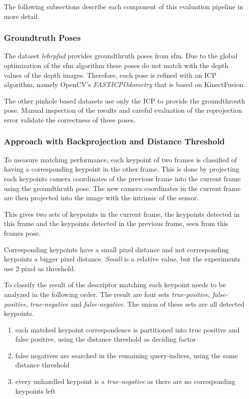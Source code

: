 The following subsections describe each component of this evaluation pipeline in more detail.

\subsubsection{Groundtruth Poses}

The dataset \emph{lehrpfad} provides groundthruth poses from \gls{sfm}.
Due to the global optimization of the \gls{sfm} algorithm these poses do not match with the depth values of the depth images.
Therefore, each pose is refined with an ICP algorithm, namely OpenCV's \emph{FASTICPOdometry} that is based on KinectFusion\cite{newcombe_ismar2011}.

The other pinhole based datasets use only the ICP to provide the groundthrouth pose.
Manual inspection of the results and careful evaluation of the reprojection error validate the correctness of these poses.

\subsubsection{Approach with Backprojection and Distance Threshold}

To measure matching performance, each keypoint of two frames is classified of having a corresponding keypoint in the other frame.
This is done by projecting each keypoints camera coordinates of the previous frame into the current frame using the groundthruth pose.
The new camera coordinates in the current frame are then projected into the image with the intrinsic of the sensor.

This gives two sets of keypoints in the current frame, the keypoints detected in this frame and the keypoints detected in the previous frame, seen from this frames pose.


Corresponding keypoints have a small pixel distance and not corresponding keypoints a bigger pixel distance.
\emph{Small} is a relative value, but the experiments use 2 pixel as threshold.

To classify the result of the descriptor matching each keypoint needs to be analyzed in the following order.
The result are four sets \emph{true-positive}, \emph{false-positive}, \emph{true-negative} and \emph{false-negative}.
The union of these sets are all detected keypoints.

\begin{enumerate}
    \item each matched keypoint correspondence is partitioned into true positive and false positive, using the distance threshold as deciding factor
    \item false negatives are searched in the remaining query-indices, using the same distance threshold
    \item every unhandled keypoint is a \emph{true-negative} as there are no corresponding keypoints left
\end{enumerate}


